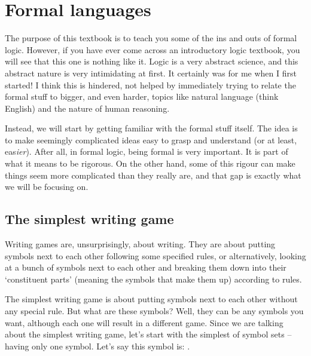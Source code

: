 \chapter{Formal languages}

The purpose of this textbook is to teach you some of the ins and outs of formal logic. However, if you have ever come across an introductory logic textbook, you will see that this one is nothing like it. Logic is a very abstract science, and this abstract nature is very intimidating at first. It certainly was for me when I first started! I think this is hindered, not helped by immediately trying to relate the formal stuff to bigger, and even harder, topics like natural language (think English) and the nature of human reasoning. 

Instead, we will start by getting familiar with the formal stuff itself. The idea is to make seemingly complicated ideas easy to grasp and understand (or at least, eas\textit{ier}). After all, in formal logic, being formal is very important. It is part of what it means to be rigorous. On the other hand, some of this rigour can make things seem more complicated than they really are, and that gap is exactly what we will be focusing on. 

\section{The simplest writing game}

Writing games are, unsurprisingly, about writing. They are about putting symbols next to each other following some specified rules, or alternatively, looking at a bunch of symbols next to each other and breaking them down into their `constituent parts' (meaning the symbols that make them up) according to rules. 

The simplest writing game is about putting symbols next to each other without any special rule. But what are these symbols? Well, they can be any symbols you want, although each one will result in a different game. Since we are talking about the simplest writing game, let's start with the simplest of symbol sets -- having only one symbol. Let's say this symbol is: \bcirc{}.

\begin{center}
\end{center}

